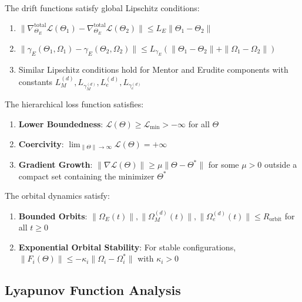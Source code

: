 \begin{assumption}
\label{ass:lipschitz}
The drift functions satisfy global Lipschitz conditions:
\begin{enumerate}
\item $\|\nabla_{\Theta_E}^{\text{total}} \mathcal{L}(\Theta_1) - \nabla_{\Theta_E}^{\text{total}} \mathcal{L}(\Theta_2)\| \leq L_E \|\Theta_1 - \Theta_2\|$ 
\item $\|\gamma_E(\Theta_1, \Omega_1) - \gamma_E(\Theta_2, \Omega_2)\| \leq L_{\gamma_E} (\|\Theta_1 - \Theta_2\| + \|\Omega_1 - \Omega_2\|)$
\item Similar Lipschitz conditions hold for Mentor and Erudite components with constants $L_M^{(d)}, L_{\gamma_M^{(d)}}, L_e^{(d)}, L_{\gamma_e^{(d)}}$
\end{enumerate}
\end{assumption}

\begin{assumption}
\label{ass:coercivity}
The hierarchical loss function satisfies:
\begin{enumerate}
\item \textbf{Lower Boundedness}: $\mathcal{L}(\Theta) \geq \mathcal{L}_{\text{min}} > -\infty$ for all $\Theta$
\item \textbf{Coercivity}: $\lim_{\|\Theta\| \to \infty} \mathcal{L}(\Theta) = +\infty$
\item \textbf{Gradient Growth}: $\|\nabla \mathcal{L}(\Theta)\| \geq \mu \|\Theta - \Theta^*\|$ for some $\mu > 0$ outside a compact set containing the minimizer $\Theta^*$
\end{enumerate}
\end{assumption}

\begin{assumption}
\label{ass:orbital_stability}
The orbital dynamics satisfy:
\begin{enumerate}
\item \textbf{Bounded Orbits}: $\|\Omega_E(t)\|, \|\Omega_M^{(d)}(t)\|, \|\Omega_e^{(d)}(t)\| \leq R_{\text{orbit}}$ for all $t \geq 0$
\item \textbf{Exponential Orbital Stability}: For stable configurations, $\|F_i(\Theta)\| \leq -\kappa_i \|\Omega_i - \Omega_i^*\|$ with $\kappa_i > 0$
\end{enumerate}
\end{assumption}

\subsection{Lyapunov Function Analysis}

